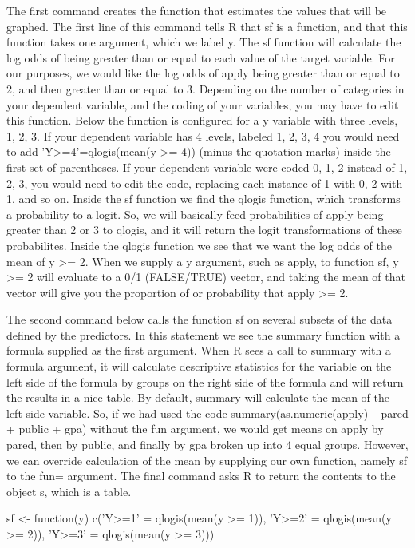 \documentclass[00-GLMregression.tex]{subfiles}
\begin{document}
The first command creates the function that estimates the values that will be graphed. The first line of this command tells R that sf is a function, and that this function takes one argument, which we label y. The sf function will calculate the log odds of being greater than or equal to each value of the target variable. For our purposes, we would like the log odds of apply being greater than or equal to 2, and then greater than or equal to 3. Depending on the number of categories in your dependent variable, and the coding of your variables, you may have to edit this function. Below the function is configured for a y variable with three levels, 1, 2, 3. If your dependent variable has 4 levels, labeled 1, 2, 3, 4 you would need to add 'Y>=4'=qlogis(mean(y >= 4)) (minus the quotation marks) inside the first set of parentheses. If your dependent variable were coded 0, 1, 2 instead of 1, 2, 3, you would need to edit the code, replacing each instance of 1 with 0, 2 with 1, and so on. Inside the sf function we find the qlogis function, which transforms a probability to a logit. So, we will basically feed probabilities of apply being greater than 2 or 3 to qlogis, and it will return the logit transformations of these probabilites. Inside the qlogis function we see that we want the log odds of the mean of y >= 2. When we supply a y argument, such as apply, to function sf, y >= 2 will evaluate to a 0/1 (FALSE/TRUE) vector, and taking the mean of that vector will give you the proportion of or probability that apply >= 2.

The second command below calls the function sf on several subsets of the data defined by the predictors. In this statement we see the summary function with a formula supplied as the first argument. When R sees a call to summary with a formula argument, it will calculate descriptive statistics for the variable on the left side of the formula by groups on the right side of the formula and will return the results in a nice table. By default, summary will calculate the mean of the left side variable. So, if we had used the code summary(as.numeric(apply) ~ pared + public + gpa) without the fun argument, we would get means on apply by pared, then by public, and finally by gpa broken up into 4 equal groups. However, we can override calculation of the mean by supplying our own function, namely sf to the fun= argument. The final command asks R to return the contents to the object s, which is a table.

sf <- function(y) {
  c('Y>=1' = qlogis(mean(y >= 1)),
    'Y>=2' = qlogis(mean(y >= 2)),
    'Y>=3' = qlogis(mean(y >= 3)))
}
\end{document}
